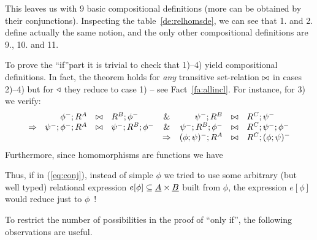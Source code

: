 \documentclass[10pt]{article}
\begin{document}
\noindent
This leaves us with 9 basic compositional definitions (more can be
obtained by their conjunctions). Inspecting the
table~\ref{de:relhomsde}, we can see that 1. and 2. define actually the same
notion, and the only other compositional definitions are 9., 10. and 11.

To prove the ``if''part it is trivial to check that 1)--4) yield
compositional definitions. In fact, the theorem holds for {\em
any} transitive set-relation $\bowtie$ in cases 2)--4) but for
$\triangleleft$ they reduce to case 1) -- see Fact~\ref{fa:allincl}.
For instance, for 3) we verify:
\[ 
\begin{array}{rclcrcl} 
\phi^-;R^A &\any & R^B;\phi^- & 
         \& &  \psi^-;R^B & \any & R^C;\psi^- \\
\impl\ \ \psi^-;\phi^-;R^A & \any & \psi^-;R^B;\phi^- & 
         \& & \psi^-;R^B;\phi^- &\any &R^C;\psi^-;\phi^-   \\%
& & & \impl & (\phi;\psi)^-;R^A & \any & R^C;(\phi;\psi)^-
\end{array}
\]
Furthermore, since homomorphisms are functions we have

Thus, if in (\ref{eq:conj}), instead of simple $\phi$ we tried to use
some arbitrary (but well typed) relational expression
$e[\phi]\subseteq \underline {A}\times\underline {B}$ built from $\phi$, the
expression $e[\phi]$ would reduce just to $\phi$~!
\medskip

To restrict the number of possibilities in the proof of ``only if'',
the following observations are useful.
\end{document}
